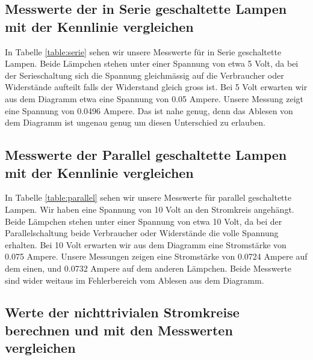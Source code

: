\documentclass[12pt, a4paper, twoside]{article}
\begin{document}

\subsection{Messwerte der in Serie geschaltette Lampen mit der Kennlinie vergleichen}
In Tabelle \ref{table:serie} sehen wir unsere Messwerte für in Serie geschaltette Lampen.
Beide Lämpchen stehen unter einer Spannung von etwa 5 Volt, da bei der Serieschaltung sich die Spannung gleichmässig auf die Verbraucher oder Widerstände aufteilt falls der Widerstand gleich gross ist.
Bei 5 Volt erwarten wir aus dem Diagramm etwa eine Spannung von 0.05 Ampere.
Unsere Messung zeigt eine Spannung von 0.0496 Ampere.
Das ist nahe genug, denn das Ablesen von dem Diagramm ist ungenau genug um diesen Unterschied zu erlauben.

\subsection{Messwerte der Parallel geschaltette Lampen mit der Kennlinie vergleichen}
In Tabelle \ref{table:parallel} sehen wir unsere Messwerte für parallel geschaltette Lampen.
Wir haben eine Spannung von 10 Volt an den Stromkreis angehängt.
Beide Lämpchen stehen unter einer Spannung von etwa 10 Volt, da bei der Parallelschaltung beide Verbraucher oder Widerstände die volle Spannung erhalten.
Bei 10 Volt erwarten wir aus dem Diagramm eine Stromstärke von 0.075 Ampere.
Unsere Messungen zeigen eine Stromstärke von 0.0724 Ampere auf dem einen, und 0.0732 Ampere auf dem anderen Lämpchen.
Beide Messwerte sind wider weitaus im Fehlerbereich vom Ablesen aus dem Diagramm.

\subsection{Werte der nichttrivialen Stromkreise berechnen und mit den Messwerten vergleichen}
\end{document}
